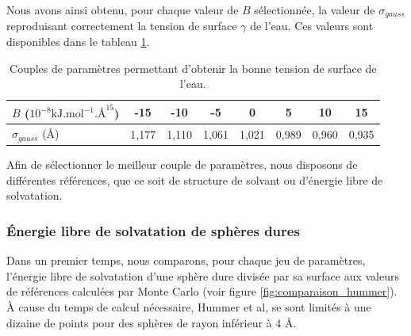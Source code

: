 Nous avons ainsi obtenu, pour chaque valeur de $B$ sélectionnée, la valeur de $\sigma_{gauss}$ reproduisant correctement la tension de surface $\gamma$ de l'eau. Ces valeurs sont disponibles dans le tableau \ref{tab:parametres_bridge}.

\begin{table}[ht]
 \centering
  \begin{tabular}{l || c c c c c c c}
    \hline
    $B$ ($10^{-8} \mathrm{kJ.mol}^{-1}.\text{\AA}^{15}$)  & -15 & -10 & -5 & 0 & 5 & 10 & 15  \\
    \hline
     $\sigma_{gauss}$ (\AA)  & 1,177 & 1,110 & 1,061 & 1,021 & 0,989 & 0,960 & 0,935  \\
    \hline
  \end{tabular}
  \caption{Couples de paramètres permettant d'obtenir la bonne tension de surface de l'eau.}
  \label{tab:parametres_bridge}  
\end{table}

Afin de sélectionner le meilleur couple de paramètres, nous disposons de différentes références, que ce soit de structure de solvant ou d'énergie libre de solvatation. 


\subsubsection{\'Energie libre de solvatation de sphères dures}
Dans un premier temps, nous comparons, pour chaque jeu de paramètres, l'\'energie libre de solvatation d'une sphère dure divisée par sa surface aux valeurs de références calculées par Monte Carlo\cite{hummer_information_1996} (voir figure \ref{fig:comparaison_hummer}). À cause du temps de calcul nécessaire, Hummer et al\cite{hummer_information_1996}, se sont limités à une dizaine de points pour des sphères de rayon inférieur à 4 \AA.



